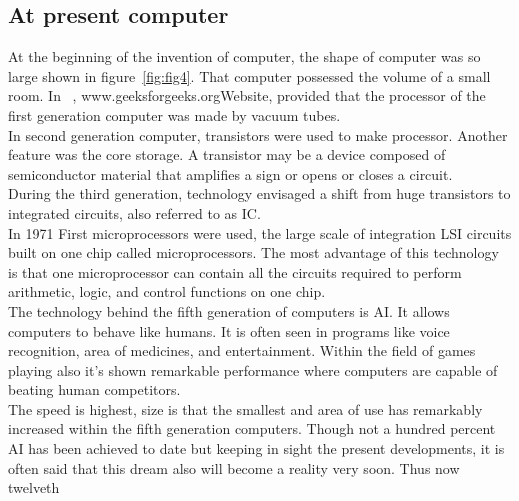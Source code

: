 \subsection{At present computer}
At the beginning of the invention of computer, the shape of computer was so large shown in figure~\ref{fig:fig4}. That computer possessed the volume of a small room. In ~\cite{www.geeksforgeeks.org}, www.geeksforgeeks.orgWebsite, provided that the processor of the first generation computer was made by vacuum tubes.\\In second generation computer, transistors were used to make processor. Another feature was the core storage. A transistor may be a device composed of semiconductor material that amplifies a sign or opens or closes a circuit.\\ During the third generation, technology envisaged a shift from huge transistors to integrated circuits, also referred to as IC. \\
In 1971 First microprocessors were used, the large scale of integration LSI circuits built on one chip called microprocessors. The most advantage of this technology is that one microprocessor can contain all the circuits required to perform arithmetic, logic, and control functions on one chip.\\
The technology behind the fifth generation of computers is AI. It allows computers to behave like humans. It is often seen in programs like voice recognition, area of medicines, and entertainment. Within the field of games playing also it’s shown remarkable performance where computers are capable of beating human competitors.\\
The speed is highest, size is that the smallest and area of use has remarkably increased within the fifth generation computers. Though not a hundred percent AI has been achieved to date but keeping in sight the present developments, it is often said that this dream also will become a reality very soon. Thus now twelveth 


